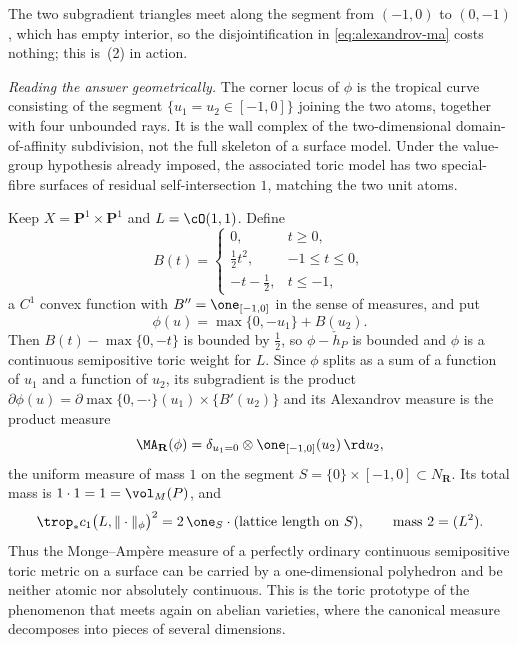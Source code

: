\begin{example}
The two subgradient triangles meet along the segment from $(-1,0)$ to
$(0,-1)$, which has empty interior, so the disjointification in
\eqref{eq:alexandrov-ma} costs nothing; this is
\,(2) in action.

\emph{Reading the answer geometrically.}  The corner locus of $\phi$ is
the tropical curve consisting of the segment $\{u_1=u_2\in[-1,0]\}$
joining the two atoms, together with four unbounded rays.  It is the
wall complex of the two-dimensional domain-of-affinity subdivision, not
the full skeleton of a surface model.  Under the value-group hypothesis
already imposed, the associated toric model has two special-fibre surfaces
of residual self-intersection $1$, matching the two unit atoms.
\end{example}

\begin{example}
\label{ex:ch19-toric-segment}
Keep $X=\mathbf P^1\times\mathbf P^1$ and $L=\cO(1,1)$.  Define
\[
 B(t)=\begin{cases}
        0, & t\geq0,\\
        \tfrac12t^2, & -1\leq t\leq0,\\
        -t-\tfrac12, & t\leq-1,
      \end{cases}
\]
a $C^1$ convex function with $B''=\one_{[-1,0]}$ in the sense of
measures, and put
\[
 \phi(u)=\max\{0,-u_1\}+B(u_2).
\]
Then $B(t)-\max\{0,-t\}$ is bounded by $\tfrac12$, so
$\phi-\check h_P$ is bounded and $\phi$ is a continuous semipositive
toric weight for $L$.  Since $\phi$ splits as a sum of a function of
$u_1$ and a function of $u_2$, its subgradient is the product
$\partial\phi(u)=\partial\max\{0,-\cdot\}(u_1)\times\{B'(u_2)\}$ and its
Alexandrov measure is the product measure
\[
 \MA_{\mathbf R}(\phi)
 =\delta_{u_1=0}\otimes\one_{[-1,0]}(u_2)\,\rd u_2 ,
\]
the uniform measure of mass $1$ on the segment
$S=\{0\}\times[-1,0]\subset N_{\mathbf R}$.  Its total mass is
$1\cdot1=1=\vol_M(P)$, and
\[
 \trop_*c_1\bigl(L,\|\cdot\|_\phi\bigr)^2
 =2\,\one_S\cdot(\text{lattice length on }S),
 \qquad\text{mass }2=(L^2).
\]
Thus the Monge--Amp\`ere measure of a perfectly ordinary continuous
semipositive toric metric on a surface can be carried by a
one-dimensional polyhedron and be neither atomic nor absolutely continuous.
This is the toric prototype of the phenomenon that
 meets again on abelian varieties, where the
canonical measure decomposes into pieces of several dimensions.
\end{example}


